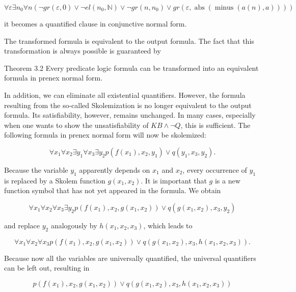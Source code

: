 \documentclass[10pt]{article}
\begin{document}
$$
\forall \varepsilon \exists n_{0} \forall n\left(\neg g r(\varepsilon, 0) \vee \neg e l\left(n_{0}, \mathbb{N}\right) \vee \neg g r\left(n, n_{0}\right) \vee g r(\varepsilon, \operatorname{abs}(\operatorname{minus}(a(n), a)))\right)
$$

it becomes a quantified clause in conjunctive normal form.

The transformed formula is equivalent to the output formula. The fact that this transformation is always possible is guaranteed by

Theorem 3.2 Every predicate logic formula can be transformed into an equivalent formula in prenex normal form.

In addition, we can eliminate all existential quantifiers. However, the formula resulting from the so-called Skolemization is no longer equivalent to the output formula. Its satisfiability, however, remains unchanged. In many cases, especially when one wants to show the unsatisfiability of $K B \wedge \neg Q$, this is sufficient. The following formula in prenex normal form will now be skolemized:

$$
\forall x_{1} \forall x_{2} \exists y_{1} \forall x_{3} \exists y_{2} p\left(f\left(x_{1}\right), x_{2}, y_{1}\right) \vee q\left(y_{1}, x_{3}, y_{2}\right) .
$$

Because the variable $y_{1}$ apparently depends on $x_{1}$ and $x_{2}$, every occurrence of $y_{1}$ is replaced by a Skolem function $g\left(x_{1}, x_{2}\right)$. It is important that $g$ is a new function symbol that has not yet appeared in the formula. We obtain

$$
\forall x_{1} \forall x_{2} \forall x_{3} \exists y_{2} p\left(f\left(x_{1}\right), x_{2}, g\left(x_{1}, x_{2}\right)\right) \vee q\left(g\left(x_{1}, x_{2}\right), x_{3}, y_{2}\right)
$$

and replace $y_{2}$ analogously by $h\left(x_{1}, x_{2}, x_{3}\right)$, which leads to

$$
\forall x_{1} \forall x_{2} \forall x_{3} p\left(f\left(x_{1}\right), x_{2}, g\left(x_{1}, x_{2}\right)\right) \vee q\left(g\left(x_{1}, x_{2}\right), x_{3}, h\left(x_{1}, x_{2}, x_{3}\right)\right) .
$$

Because now all the variables are universally quantified, the universal quantifiers can be left out, resulting in

$$
p\left(f\left(x_{1}\right), x_{2}, g\left(x_{1}, x_{2}\right)\right) \vee q\left(g\left(x_{1}, x_{2}\right), x_{3}, h\left(x_{1}, x_{2}, x_{3}\right)\right)
$$
\end{document}
